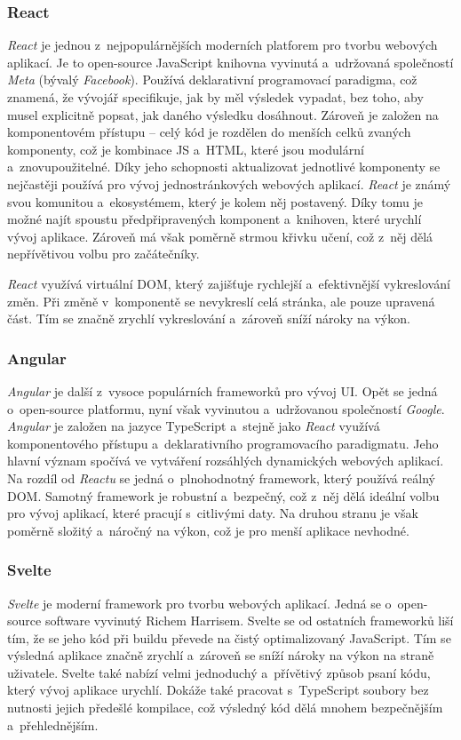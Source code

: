 \subsubsection*{React}
\textit{React} je jednou z~nejpopulárnějších moderních platforem pro tvorbu webových aplikací. Je to open-source JavaScript knihovna vyvinutá a~udržovaná společností \textit{Meta} (bývalý \textit{Facebook}). Používá deklarativní programovací paradigma, což znamená, že vývojář specifikuje, jak by měl výsledek vypadat, bez toho, aby musel explicitně popsat, jak daného výsledku dosáhnout. Zároveň je založen na komponentovém přístupu -- celý kód je rozdělen do menších celků zvaných komponenty, což je kombinace JS a~HTML, které jsou modulární a~znovupoužitelné. Díky jeho schopnosti aktualizovat jednotlivé komponenty se nejčastěji používá pro vývoj jednostránkových webových aplikací. \textit{React} je známý svou komunitou a~ekosystémem, který je kolem něj postavený. Díky tomu je možné najít spoustu předpřipravených komponent a~knihoven, které urychlí vývoj aplikace. Zároveň má však poměrně strmou křivku učení, což z~něj dělá nepřívětivou volbu pro začátečníky.

\textit{React} využívá virtuální DOM, který zajišťuje rychlejší a~efektivnější vykreslování změn. Při změně v~komponentě se nevykreslí celá stránka, ale pouze upravená část. Tím se značně zrychlí vykreslování a~zároveň sníží nároky na výkon. \cite{react, what_react_is_and_why_it_matters,angular_vs_react}

\subsubsection*{Angular}
\textit{Angular} je další z~vysoce populárních frameworků pro vývoj UI. Opět se jedná o~open-source platformu, nyní však vyvinutou a~udržovanou společností \textit{Google}. \textit{Angular} je založen na jazyce TypeScript a~stejně jako \textit{React} využívá komponentového přístupu a~deklarativního programovacího paradigmatu. Jeho hlavní význam spočívá ve vytváření rozsáhlých dynamických webových aplikací. Na rozdíl od \textit{Reactu} se jedná o~plnohodnotný framework, který používá reálný DOM. Samotný framework je robustní a~bezpečný, což z~něj dělá ideální volbu pro vývoj aplikací, které pracují s~citlivými daty. Na druhou stranu je však poměrně složitý a~náročný na výkon, což je pro menší aplikace nevhodné. \cite{what_is_angular,angular_vs_react}

\subsubsection*{Svelte}
\textit{Svelte} je moderní framework pro tvorbu webových aplikací. Jedná se o~open-source software vyvinutý Richem Harrisem. Svelte se od ostatních frameworků liší tím, že se jeho kód při buildu převede na čistý optimalizovaný JavaScript. Tím se výsledná aplikace značně zrychlí a~zároveň se sníží nároky na výkon na straně uživatele. Svelte také nabízí velmi jednoduchý a~přívětivý způsob psaní kódu, který vývoj aplikace urychlí. Dokáže také pracovat s~TypeScript soubory bez nutnosti jejich předešlé kompilace, což výsledný kód dělá mnohem bezpečnějším a~přehlednějším. \cite{svelte_and_why_you_should_consider_it,svelte}

